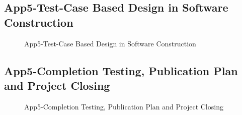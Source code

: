 \pagebreak
\subsection{App5-Test-Case Based Design in Software Construction}
\begin{figure}[htbp]
	\begin{center}
		\caption{App5-Test-Case Based Design in Software Construction}
		\label{fig:App5-07-Research-Implementation-Plan.png}
	\end{center}
\end{figure}

\pagebreak
\subsection{App5-Completion Testing, Publication Plan and Project Closing}
\begin{figure}[htbp]
	\begin{center}
		\caption{App5-Completion Testing, Publication Plan and Project Closing}
		\label{fig:App5-08-Research-Implementation-Plan.png}
	\end{center}
\end{figure}

